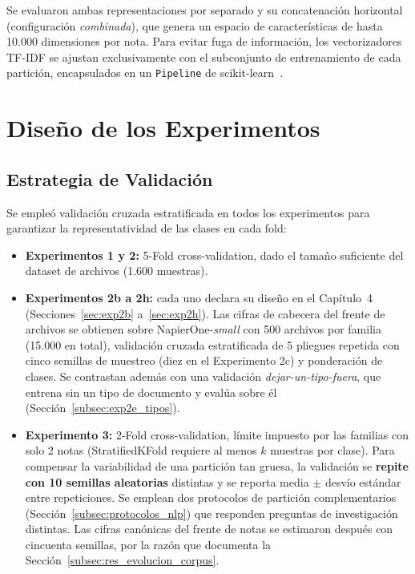 Se evaluaron ambas representaciones por separado y su concatenación horizontal (configuración \textit{combinada}), que genera un espacio de características de hasta 10.000 dimensiones por nota. Para evitar fuga de información, los vectorizadores TF-IDF se ajustan exclusivamente con el subconjunto de entrenamiento de cada partición, encapsulados en un \texttt{Pipeline} de scikit-learn~\cite{sklearn}.

\section{Diseño de los Experimentos}

\subsection{Estrategia de Validación}

Se empleó validación cruzada estratificada en todos los experimentos para garantizar la representatividad de las clases en cada fold:

\begin{itemize}
    \item \textbf{Experimentos 1 y 2:} 5-Fold cross-validation, dado el tamaño suficiente del dataset de archivos (1.600 muestras).
    \item \textbf{Experimentos 2b a 2h:} cada uno declara su diseño en el Capítulo~4 (Secciones~\ref{sec:exp2b} a~\ref{sec:exp2h}). Las cifras de cabecera del frente de archivos se obtienen sobre NapierOne-\textit{small} con 500 archivos por familia (15.000 en total), validación cruzada estratificada de 5 pliegues repetida con cinco semillas de muestreo (diez en el Experimento 2c) y ponderación de clases. Se contrastan además con una validación \textit{dejar-un-tipo-fuera}, que entrena sin un tipo de documento y evalúa sobre él (Sección~\ref{subsec:exp2e_tipos}).
    \item \textbf{Experimento 3:} 2-Fold cross-validation, límite impuesto por las familias con solo 2 notas (StratifiedKFold requiere al menos $k$ muestras por clase). Para compensar la variabilidad de una partición tan gruesa, la validación se \textbf{repite con 10 semillas aleatorias} distintas y se reporta media $\pm$ desvío estándar entre repeticiones. Se emplean dos protocolos de partición complementarios (Sección~\ref{subsec:protocolos_nlp}) que responden preguntas de investigación distintas. Las cifras canónicas del frente de notas se estimaron después con cincuenta semillas, por la razón que documenta la Sección~\ref{subsec:res_evolucion_corpus}.
\end{itemize}

